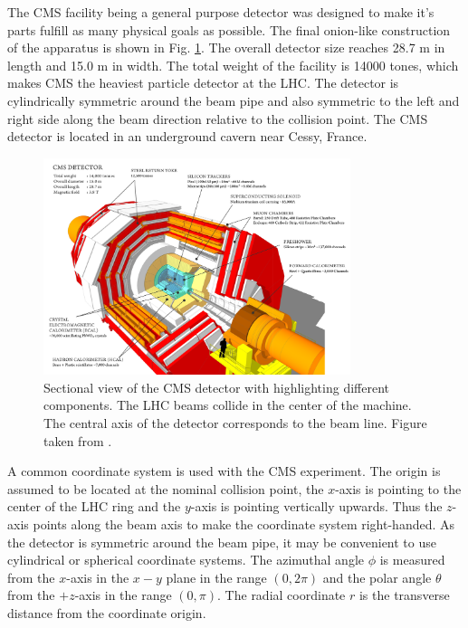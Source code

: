 The CMS facility being a general purpose detector was designed to make it's parts fulfill as many physical goals as possible.
The final onion-like construction of the apparatus is shown in Fig. \ref{fig:CMSview}. The overall detector size reaches 28.7 m in length
and 15.0 m in width. The total weight of the facility is 14000 tones, which makes CMS the heaviest particle detector at the
LHC. The detector is cylindrically symmetric around the beam pipe and also symmetric to the left and right side along the beam direction
relative to the collision point. The CMS detector is located in an underground cavern near Cessy, France.

\begin{figure}
  \centering
  \includegraphics[width=0.8\textwidth]{02_experimental_setup/plots/cms_120918_03.png}
  \caption{Sectional view of the CMS detector with highlighting different components. 
  The LHC beams collide in the center of the machine. The central axis of the detector 
  corresponds to the beam line. Figure taken from \cite{Sakuma:2013jqa}.}
  \label{fig:CMSview}
\end{figure}

A common coordinate system is used with the CMS experiment. The origin  
is assumed to be located at the nominal collision point, the $x$-axis is pointing to the center of the 
LHC ring and the $y$-axis is pointing vertically upwards. Thus the $z$-axis points along the beam axis to make
the coordinate system right-handed. As the detector is symmetric around the beam pipe, it may be convenient to use cylindrical or spherical
coordinate systems. The azimuthal angle $\phi$ is measured from the $x$-axis in the $x-y$ plane in the range $(0, 2\pi)$ 
and the polar angle $\theta$ from the $+z$-axis in the range $(0, \pi)$. The radial coordinate $r$ is the transverse distance from the coordinate origin. 

